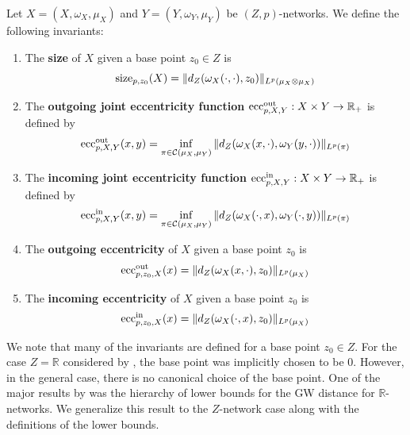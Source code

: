 \documentclass[twoside,11pt]{article}
\theoremstyle{definition}
\newcommand{\eccout}{\textnormal{ecc}_{p,X,Y}^{\textnormal{out}}}
\newcommand{\eccoutpX}{\textnormal{ecc}_{p,z_0,X}^{\textnormal{out}}}
\newcommand{\eccin}{\textnormal{ecc}_{p, X,Y}^{\textnormal{in}}}
\newcommand{\eccinpX}{\textnormal{ecc}_{p,z_0,X}^{\textnormal{in}}}
\newcommand{\define}[1]{\textbf{#1}}
\begin{document}
\begin{definition}\label{def:invariants}
    Let $X=(X,\omega_X,\mu_X)$ and $Y=(Y, \omega_Y,\mu_Y)$ be  $(Z,p)$-networks. We define the following invariants:
    \begin{enumerate}
        \item The \define{size} of $X$ given a base point $z_0\in Z$ is
              \begin{equation}
                \label{def:size}
                  \textnormal{size}_{p,z_0}(X) = \| d_Z(\omega_{X}(\cdot,\cdot),z_0)\|_{L^p(\mu_X\otimes \mu_X)}
              \end{equation}
        \item The \define{outgoing joint eccentricity function} $\eccout : X\times Y \to \mathbb{R}_{+}$ is defined by
              \begin{equation}
                  \eccout(x,y) = \inf_{\pi\in \mathcal{C}(\mu_X,\mu_Y)}\|d_Z(\omega_{X}(x,\cdot),\omega_Y(y,\cdot))\|_{L^p(\pi)}
              \end{equation}
        \item The \define{incoming joint eccentricity function} $\eccin : X\times Y \to \mathbb{R}_{+}$ is defined by
              \begin{equation}
                  \eccin(x,y) = \inf_{\pi\in \mathcal{C}(\mu_X,\mu_Y)}\|d_Z(\omega_{X}(\cdot,x),\omega_Y(\cdot,y))\|_{L^p(\pi)}
              \end{equation}
        \item The \define{outgoing eccentricity} of $X$ given a base point $z_0$ is
              \begin{equation}
                  \eccoutpX(x) = \|d_Z(\omega_{X}(x,\cdot),z_0)\|_{L^p(\mu_X)}
              \end{equation}
        \item The \define{incoming eccentricity} of $X$ given a base point $z_0$ is
              \begin{equation}
                  \eccinpX(x) = \|d_Z(\omega_{X}(\cdot,x),z_0)\|_{L^p(\mu_X)}
              \end{equation}
    \end{enumerate}
\end{definition}
We note that many of the invariants are defined for a base point $z_0\in Z$. For the case $Z=\mathbb{R}$ considered by \citet{chowdhury2019gromov}, the base point was implicitly chosen to be $0$. However, in the general case, there is no canonical choice of the base point. One of the major results by \citet{chowdhury2019gromov} was the hierarchy of lower bounds for the GW distance for $\mathbb{R}$-networks. We generalize this result to the $Z$-network case along with the definitions of the lower bounds.
\end{document}

